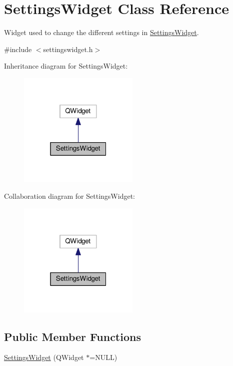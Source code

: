 \hypertarget{classSettingsWidget}{}\section{Settings\+Widget Class Reference}
\label{classSettingsWidget}


Widget used to change the different settings in \hyperlink{classSettingsWidget}{Settings\+Widget}.  




{\ttfamily \#include $<$settingswidget.\+h$>$}



Inheritance diagram for Settings\+Widget\+:
\nopagebreak
\begin{figure}[H]
\begin{center}
\leavevmode
\includegraphics[width=163pt]{classSettingsWidget__inherit__graph}
\end{center}
\end{figure}


Collaboration diagram for Settings\+Widget\+:
\nopagebreak
\begin{figure}[H]
\begin{center}
\leavevmode
\includegraphics[width=163pt]{classSettingsWidget__coll__graph}
\end{center}
\end{figure}
\subsection*{Public Member Functions}
\begin{DoxyCompactItemize}
\item 
\hyperlink{classSettingsWidget_a339891dcba7d2813bc5d894bff494a78}{Settings\+Widget} (Q\+Widget $\ast$=N\+U\+LL)
\end{DoxyCompactItemize}



